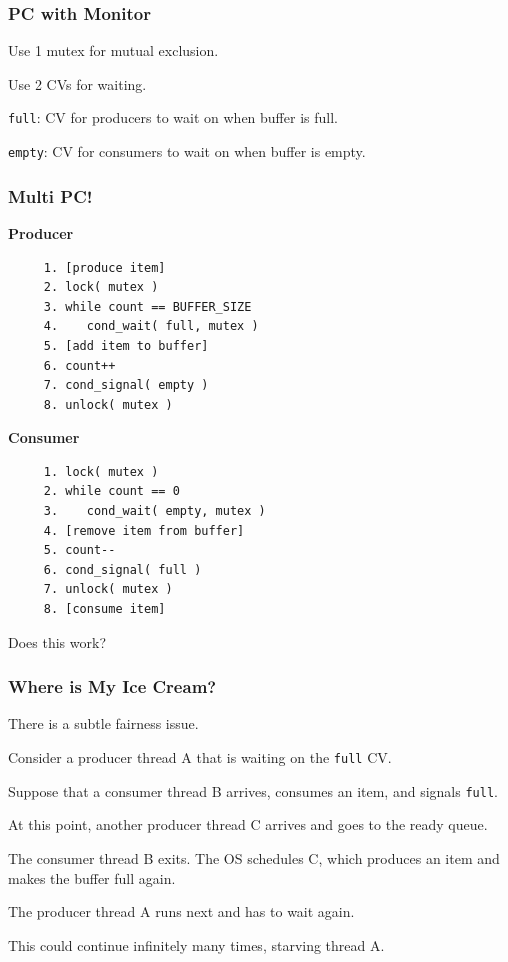\begin{frame}
	\frametitle{PC with Monitor}

	Use 1 mutex for mutual exclusion.

	Use 2 CVs for waiting.

	\texttt{full}: CV for producers to wait on when buffer is full.

	\texttt{empty}: CV for consumers to wait on when buffer is empty.
\end{frame}


\begin{frame}[fragile]
	\frametitle{Multi PC!}

	\begin{multicols}{2}
		\small
		\textbf{Producer}
		\begin{verbatim}
	 1. [produce item]
	 2. lock( mutex )
	 3. while count == BUFFER_SIZE
	 4.    cond_wait( full, mutex )
	 5. [add item to buffer]
	 6. count++
	 7. cond_signal( empty )
	 8. unlock( mutex )
		\end{verbatim}
		\columnbreak
		\textbf{Consumer}\vspace{-2em}
		\begin{verbatim}
	 1. lock( mutex )
	 2. while count == 0
	 3.    cond_wait( empty, mutex )
	 4. [remove item from buffer]
	 5. count--
	 6. cond_signal( full )
	 7. unlock( mutex )
	 8. [consume item]
		\end{verbatim}
	\end{multicols}
	\vspace{-2em}

	Does this work?

\end{frame}

\begin{frame}
	\frametitle{Where is My Ice Cream?}
	There is a subtle fairness issue.

	Consider a producer thread A that is waiting on the \texttt{full} CV.

	Suppose that a consumer thread B arrives, consumes an item, and signals \texttt{full}.

	At this point, another producer thread C arrives and goes to the ready queue.

	The consumer thread B exits.
	The OS schedules C, which produces an item and makes the buffer full again.

	The producer thread A runs next and has to wait again.

	This could continue infinitely many times, starving thread A.
\end{frame}

